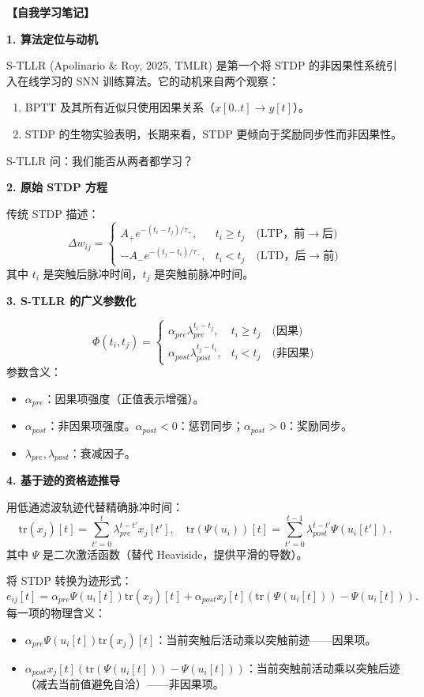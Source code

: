 \documentclass[journal,12pt,onecolumn]{IEEEtran}
\begin{document}
\bigskip\noindent\textbf{【自我学习笔记】}

\medskip\noindent\textbf{1. 算法定位与动机}

S-TLLR (Apolinario \& Roy, 2025, TMLR) 是第一个将 STDP 的非因果性系统引入在线学习的 SNN 训练算法。它的动机来自两个观察：
\begin{enumerate}
    \item BPTT 及其所有近似只使用因果关系（$x[0..t] \to y[t]$）。
    \item STDP 的生物实验表明，长期来看，STDP 更倾向于奖励同步性而非因果性。
\end{enumerate}
S-TLLR 问：我们能否从两者都学习？

\medskip\noindent\textbf{2. 原始 STDP 方程}

传统 STDP 描述：
\[
\Delta w_{ij} = 
\begin{cases}
A_+ e^{-(t_i - t_j)/\tau_+}, & t_i \ge t_j \quad \text{(LTP，前}\to\text{后)} \\
-A_- e^{-(t_j - t_i)/\tau_-}, & t_i < t_j \quad \text{(LTD，后}\to\text{前)}
\end{cases}
\]
其中 $t_i$ 是突触后脉冲时间，$t_j$ 是突触前脉冲时间。

\medskip\noindent\textbf{3. S-TLLR 的广义参数化}

\[
\Phi(t_i,t_j) = 
\begin{cases}
\alpha_{pre}\lambda_{pre}^{t_i-t_j}, & t_i \ge t_j \quad \text{(因果)} \\
\alpha_{post}\lambda_{post}^{t_j-t_i}, & t_i < t_j \quad \text{(非因果)}
\end{cases} \tag{3}
\]
参数含义：
\begin{itemize}
    \item $\alpha_{pre}$：因果项强度（正值表示增强）。
    \item $\alpha_{post}$：非因果项强度。$\alpha_{post} < 0$：惩罚同步；$\alpha_{post} > 0$：奖励同步。
    \item $\lambda_{pre}, \lambda_{post}$：衰减因子。
\end{itemize}

\medskip\noindent\textbf{4. 基于迹的资格迹推导}

用低通滤波轨迹代替精确脉冲时间：
\[
\text{tr}(x_j)[t] = \sum_{t'=0}^{t} \lambda_{pre}^{t-t'} x_j[t'], \quad \text{tr}(\Psi(u_i))[t] = \sum_{t'=0}^{t-1} \lambda_{post}^{t-t'} \Psi(u_i[t']).
\]
其中 $\Psi$ 是二次激活函数（替代 Heaviside，提供平滑的导数）。

将 STDP 转换为迹形式：
\[
e_{ij}[t] = \alpha_{pre}\Psi(u_i[t])\text{tr}(x_j)[t] + \alpha_{post}x_j[t]\left(\text{tr}(\Psi(u_i[t])) - \Psi(u_i[t])\right). \tag{11}
\]
每一项的物理含义：
\begin{itemize}
    \item $\alpha_{pre}\Psi(u_i[t])\text{tr}(x_j)[t]$：当前突触后活动乘以突触前迹——因果项。
    \item $\alpha_{post}x_j[t](\text{tr}(\Psi(u_i[t])) - \Psi(u_i[t]))$：当前突触前活动乘以突触后迹（减去当前值避免自洽）——非因果项。
\end{itemize}
\end{document}
